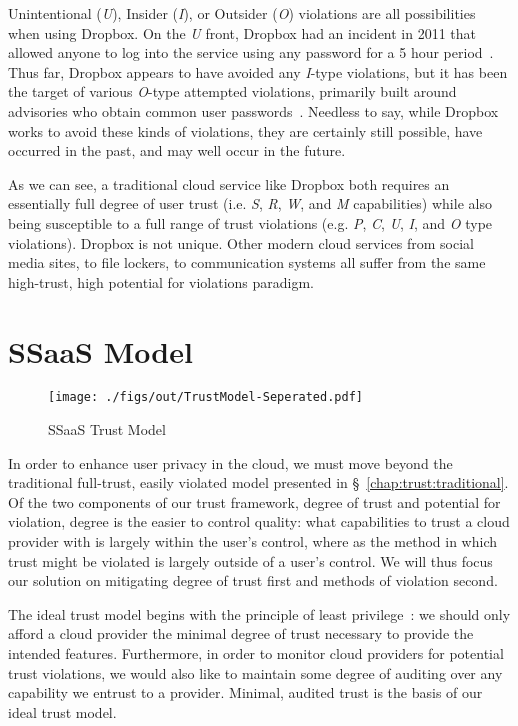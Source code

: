 Unintentional (\emph{U}), Insider (\emph{I}), or Outsider (\emph{O})
violations are all possibilities when using Dropbox. On the \emph{U}
front, Dropbox had an incident in 2011 that allowed anyone to log into
the service using any password for a 5 hour
period~\cite{dropbox-authbug}. Thus far, Dropbox appears to have
avoided any \emph{I}-type violations, but it has been the target of
various \emph{O}-type attempted violations, primarily built around
advisories who obtain common user
passwords~\cite{dropbox-passwords}. Needless to say, while Dropbox
works to avoid these kinds of violations, they are certainly still
possible, have occurred in the past, and may well occur in the future.

As we can see, a traditional cloud service like Dropbox both requires
an essentially full degree of user trust (i.e. \emph{S}, \emph{R},
\emph{W}, and \emph{M} capabilities) while also being susceptible to a
full range of trust violations (e.g. \emph{P}, \emph{C}, \emph{U},
\emph{I}, and \emph{O} type violations). Dropbox is not unique. Other
modern cloud services from social media sites, to file lockers, to
communication systems all suffer from the same high-trust, high
potential for violations paradigm.

\section{SSaaS Model}
\label{chap:trust:ssaas}

\begin{figure}[t]
  \centering
  \texttt{[image: ./figs/out/TrustModel-Seperated.pdf]}
  \caption{SSaaS Trust Model}
  \label{fig:trust-ssaas}
\end{figure}

In order to enhance user privacy in the cloud, we must move beyond the
traditional full-trust, easily violated model presented in
\S~\ref{chap:trust:traditional}. Of the two components of our trust
framework, degree of trust and potential for violation, degree is the
easier to control quality: what capabilities to trust a cloud provider
with is largely within the user's control, where as the method in which
trust might be violated is largely outside of a user's control. We
will thus focus our solution on mitigating degree of trust first and
methods of violation second.

The ideal trust model begins with the principle of least
privilege~\cite{saltzer1975}: we should only afford a cloud provider
the minimal degree of trust necessary to provide the intended
features. Furthermore, in order to monitor cloud providers for
potential trust violations, we would also like to maintain some degree
of auditing over any capability we entrust to a provider. Minimal,
audited trust is the basis of our ideal trust model.

